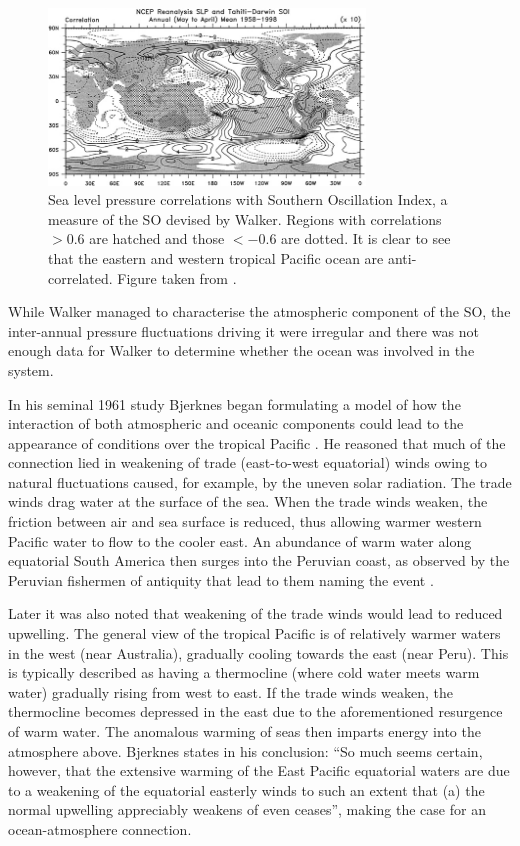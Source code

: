 \begin{figure}
  \centering
  \includegraphics[width=0.75\textwidth]{figures/slp_corr}
  \caption{Sea level pressure correlations with Southern Oscillation Index, a
    measure of the SO devised by Walker. Regions with correlations $>0.6$ are
    hatched and those $<-0.6$ are dotted. It is clear to see that the eastern
    and western tropical Pacific ocean are anti-correlated. Figure taken from
    \cite{trenberth2000}.
  }
  \label{fig:slp_corr}
\end{figure}

While Walker managed to characterise the atmospheric component of the SO, the
inter-annual pressure fluctuations driving it were irregular and there was not
enough data for Walker to determine whether the ocean was involved in the
system.

\vspace{0.5cm}

In his seminal 1961 study Bjerknes began formulating a model of how the
interaction of both atmospheric and oceanic components could lead to the
appearance of \elnino{} conditions over the tropical Pacific
\citep{bjerknes1961}. He reasoned that much of the connection lied in weakening
of trade (east-to-west equatorial) winds owing to natural fluctuations caused,
for example, by the uneven solar radiation. The trade winds drag water at the
surface of the sea. When the trade winds weaken, the friction between air and
sea surface is reduced, thus allowing warmer western Pacific water to flow to
the cooler east. An abundance of warm water along equatorial South America then
surges into the Peruvian coast, as observed by the Peruvian fishermen of
antiquity that lead to them naming the event \elnino{}.

Later \citep{bjerknes1966} it was also noted that weakening of the trade winds
would lead to reduced upwelling. The general view of the tropical Pacific is of
relatively warmer waters in the west (near Australia), gradually cooling towards
the east (near Peru). This is typically described as having a thermocline (where
cold water meets warm water) gradually rising from west to east. If the trade
winds weaken, the thermocline becomes depressed in the east due to the
aforementioned resurgence of warm water. The anomalous warming of seas then
imparts energy into the atmosphere above. Bjerknes states in his conclusion:
``So much seems certain, however, that the extensive warming of the East
Pacific equatorial waters are due to a weakening of the equatorial easterly
winds to such an extent that (a) the normal upwelling appreciably weakens of
even ceases'', making the case for an ocean-atmosphere connection.

